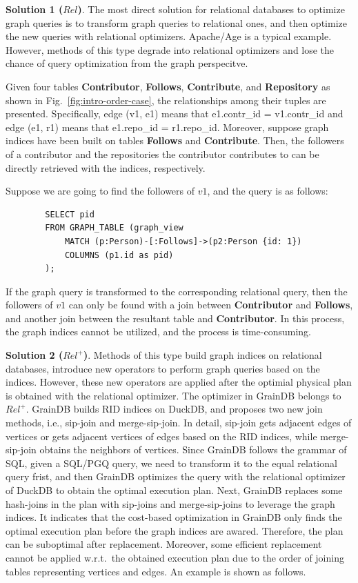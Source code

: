 \textbf{Solution 1 ($Rel$)}. 
The most direct solution for relational databases to optimize graph queries is to transform graph queries to relational ones, and then optimize the new queries with relational optimizers.
Apache/Age is a typical example.
However, methods of this type degrade into relational optimizers and lose the chance of query optimization from the graph perspecitve.

\begin{example}
    Given four tables \textbf{Contributor}, \textbf{Follows}, \textbf{Contribute}, and \textbf{Repository} as shown in Fig.~\ref{fig:intro-order-case}, the relationships among their tuples are presented.
    Specifically, edge (v1, e1) means that e1.contr\_id = v1.contr\_id and edge (e1, r1) means that e1.repo\_id = r1.repo\_id.
    Moreover, suppose graph indices have been built on tables \textbf{Follows} and \textbf{Contribute}.
    Then, the followers of a contributor and the repositories the contributor contributes to can be directly retrieved with the indices, respectively.

    Suppose we are going to find the followers of $v1$, and the query is as follows:
    \begin{lstlisting}
        SELECT pid
        FROM GRAPH_TABLE (graph_view
            MATCH (p:Person)-[:Follows]->(p2:Person {id: 1})
            COLUMNS (p1.id as pid)
        );
    \end{lstlisting}
    If the graph query is transformed to the corresponding relational query, then the followers of $v1$ can only be found with a join between \textbf{Contributor} and \textbf{Follows}, and another join between the resultant table and \textbf{Contributor}.
    In this process, the graph indices cannot be utilized, and the process is time-consuming.
\end{example}


\textbf{Solution 2 ($Rel^+$)}.
Methods of this type build graph indices on relational databases, introduce new operators to perform graph queries based on the indices.
However, these new operators are applied after the optimial physical plan is obtained with the relational optimizer.
The optimizer in GrainDB belongs to $Rel^+$.
GrainDB builds RID indices on DuckDB, and proposes two new join methods, i.e., sip-join and merge-sip-join.
In detail, sip-join gets adjacent edges of vertices or gets adjacent vertices of edges based on the RID indices, while merge-sip-join obtains the neighbors of vertices.
Since GrainDB follows the grammar of SQL, given a SQL/PGQ query, we need to transform it to the equal relational query frist, and then GrainDB optimizes the query with the relational optimizer of DuckDB to obtain the optimal execution plan.
Next, GrainDB replaces some hash-joins in the plan with sip-joins and merge-sip-joins to leverage the graph indices.
It indicates that the cost-based optimization in GrainDB only finds the optimal execution plan before the graph indices are awared.
Therefore, the plan can be suboptimal after replacement.
Moreover, some efficient replacement cannot be applied w.r.t.~the obtained execution plan due to the order of joining tables representing vertices and edges.
An example is shown as follows.

